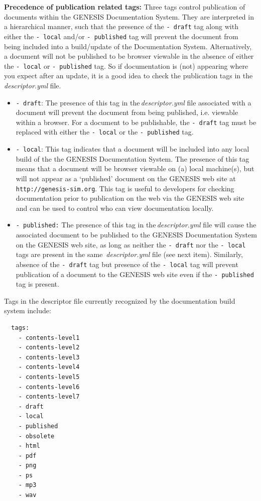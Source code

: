 \documentclass[12pt]{article}
\begin{document}
\begin{enumerate}
\begin{enumerate}
{\bf Precedence of publication related tags:} Three tags control publication of documents within the GENESIS Documentation System. They are interpreted in a hierarchical manner, such that the presence of the {\tt  -\,draft} tag along with either the {\tt -\,local} and/or {\tt -\,published} tag will prevent the document from being included into a build/update of the Documentation System. Alternatively, a document will not be published to be browser viewable in the absence of either the {\tt -\,local} or {\tt -\,published} tag. So if documentation is (not) appearing where you expect after an update, it is a good idea to check the publication tags in the {\it descriptor.yml} file.

\begin{itemize}
	\item[]{\tt -\,draft}: The presence of this tag in the\,{\it descriptor.yml} file associated with a document will prevent the document 
	from being published,  i.e. viewable within a browser. For a document to be publishable, the {\tt -\,draft} tag must be replaced 
	with either the {\tt -\,local} or the {\tt -\,published} tag.
	
	\item[]{\tt -\,local}: This tag indicates that a document will be included into any local build of the the GENESIS Documentation 
	System. The presence of this tag means that a document will be browser viewable on (a) local machine(s), but will not appear as a 
	`published' document on the GENESIS web site at {\tt http://genesis-sim.org}. This tag is useful to developers for checking documentation
	prior to publication on the web via the GENESIS web site and can be used to control who can view documentation locally.
	
	\item[]{\tt -\,published:} The presence of this tag in the\,{\it descriptor.yml} file will cause the associated document to be published to the 
	GENESIS Documentation System on the GENESIS web site, as long as neither the {\tt -\,draft} nor the {\tt -\,local} tags are present in the same
	\,{\it descriptor.yml} file (see next item). Similarly, absence of the {\tt -\,draft} tag but presence of the {\tt -\,local} tag will prevent publication of a 
	document to the GENESIS web site even if the {\tt -\,published} tag is present.

\end{itemize}

Tags in the descriptor file currently recognized by the documentation build system include:
\begin{verbatim}
  tags:
    - contents-level1
    - contents-level2
    - contents-level3
    - contents-level4
    - contents-level5
    - contents-level6
    - contents-level7
    - draft
    - local
    - published
    - obsolete
    - html
    - pdf
    - png
    - ps
    - mp3
    - wav    
\end{verbatim}


\end{enumerate}
\end{enumerate}
\end{document}
